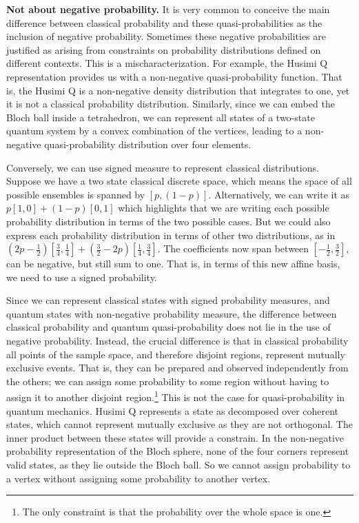 \documentclass[10pt,twocolumn, nofootinbib]{revtex4-2}
\begin{document}

\textbf{Not about negative probability.} It is very common to conceive the main difference between classical probability and these quasi-probabilities as the inclusion of negative probability. Sometimes these negative probabilities are justified as arising from constraints on probability distributions defined on different contexts. This is a mischaracterization. For example, the Husimi Q representation provides us with a non-negative quasi-probability function. That is, the Husimi Q is a non-negative density distribution that integrates to one, yet it is not a classical probability distribution. Similarly, since we can embed the Bloch ball inside a tetrahedron, we can represent all states of a two-state quantum system by a convex combination of the vertices, leading to a non-negative quasi-probability distribution over four elements.

Conversely, we can use signed measure to represent classical distributions. Suppose we have a two state classical discrete space, which means the space of all possible ensembles is spanned by $[p, (1-p)]$. Alternatively, we can write it as $p[1,0] + (1-p)[0,1]$ which highlights that we are writing each possible probability distribution in terms of the two possible cases. But we could also express each probability distribution in terms of other two distributions, as in $\left(2p - \frac{1}{2}\right)\left[\frac{3}{4}, \frac{1}{4}\right] + \left(\frac{3}{2} - 2p\right)\left[\frac{1}{4}, \frac{3}{4}\right]$. The coefficients now span between $\left[-\frac{1}{2}, \frac{3}{2}\right]$, can be negative, but still sum to one. That is, in terms of this new affine basis, we need to use a signed probability.

Since we can represent classical states with signed probability measures, and quantum states with non-negative probability measure, the difference between classical probability and quantum quasi-probability does not lie in the use of negative probability. Instead, the crucial difference is that in classical probability all points of the sample space, and therefore disjoint regions, represent mutually exclusive events. That is, they can be prepared and observed independently from the others; we can assign some probability to some region without having to assign it to another disjoint region.\footnote{The only constraint is that the probability over the whole space is one.} This is not the case for quasi-probability in quantum mechanics. Husimi Q represents a state as decomposed over coherent states, which cannot represent mutually exclusive as they are not orthogonal. The inner product between these states will provide a constrain. In the non-negative probability representation of the Bloch sphere, none of the four corners represent valid states, as they lie outside the Bloch ball. So we cannot assign probability to a vertex without assigning some probability to another vertex.
\end{document}
